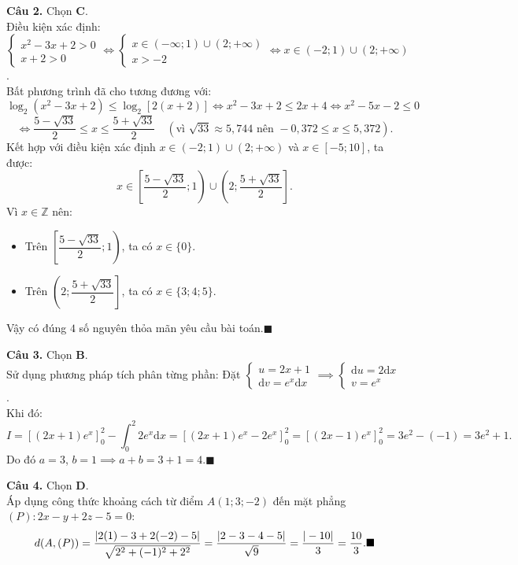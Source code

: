 \documentclass[12pt,a4paper]{article}
\begin{document}
\vspace{0.2cm}\noindent\textbf{Câu 2.} Chọn \textbf{C}.\\
Điều kiện xác định:
$\begin{cases} x^2 - 3x + 2 > 0 \\ x + 2 > 0 \end{cases} \iff \begin{cases} x \in (-\infty; 1) \cup (2; +\infty) \\ x > -2 \end{cases} \iff x \in (-2; 1) \cup (2; +\infty)$.\\
Bất phương trình đã cho tương đương với:
$$\log_2(x^2 - 3x + 2) \le \log_2[2(x + 2)] \iff x^2 - 3x + 2 \le 2x + 4 \iff x^2 - 5x - 2 \le 0$$
$$\iff \dfrac{5 - \sqrt{33}}{2} \le x \le \dfrac{5 + \sqrt{33}}{2} \quad (\text{vì } \sqrt{33} \approx 5{,}744 \text{ nên } -0{,}372 \le x \le 5{,}372).$$
Kết hợp với điều kiện xác định $x \in (-2; 1) \cup (2; +\infty)$ và $x \in [-5; 10]$, ta được:
$$x \in \left[\dfrac{5 - \sqrt{33}}{2}; 1\right) \cup \left(2; \dfrac{5 + \sqrt{33}}{2}\right].$$
Vì $x \in \mathbb{Z}$ nên:
\begin{itemize}[leftmargin=*]
    \item Trên $\left[\dfrac{5 - \sqrt{33}}{2}; 1\right)$, ta có $x \in \{0\}$.
    \item Trên $\left(2; \dfrac{5 + \sqrt{33}}{2}\right]$, ta có $x \in \{3; 4; 5\}$.
\end{itemize}
Vậy có đúng $4$ số nguyên thỏa mãn yêu cầu bài toán.\hfill$\blacksquare$

\vspace{0.2cm}\noindent\textbf{Câu 3.} Chọn \textbf{B}.\\
Sử dụng phương pháp tích phân từng phần:
Đặt $\begin{cases} u = 2x + 1 \\ \mathrm{d}v = e^x \mathrm{d}x \end{cases} \implies \begin{cases} \mathrm{d}u = 2 \mathrm{d}x \\ v = e^x \end{cases}$.\\
Khi đó:
$$I = \left[(2x + 1)e^x\right]_0^2 - \int_0^2 2e^x \mathrm{d}x = \left[(2x + 1)e^x - 2e^x\right]_0^2 = \left[(2x - 1)e^x\right]_0^2 = 3e^2 - (-1) = 3e^2 + 1.$$
Do đó $a = 3$, $b = 1 \implies a + b = 3 + 1 = 4$.\hfill$\blacksquare$

\vspace{0.2cm}\noindent\textbf{Câu 4.} Chọn \textbf{D}.\\
Áp dụng công thức khoảng cách từ điểm $A(1; 3; -2)$ đến mặt phẳng $(P): 2x - y + 2z - 5 = 0$:
$$d(A, (P)) = \dfrac{|2(1) - 3 + 2(-2) - 5|}{\sqrt{2^2 + (-1)^2 + 2^2}} = \dfrac{|2 - 3 - 4 - 5|}{\sqrt{9}} = \dfrac{|-10|}{3} = \dfrac{10}{3}.\hfill\blacksquare$$
\end{document}
